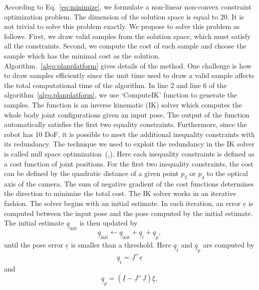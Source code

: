 According to Eq.~\ref{eq:minimize}, we formulate a non-linear non-convex constraint optimization problem. The dimension of the solution space is equal to 20. It is not trivial to solve this problem exactly. We propose to solve this problem as follows. First, we draw valid samples from the solution space, which must satisfy all the constraints. Second, we compute the cost of each sample and choose the sample which has the minimal cost as the solution. Algorithm.~\ref{algo:planplatform} gives details of the method. One challenge is how to draw samples efficiently since the unit time used to draw a valid sample affects the total computational time of the algorithm. In line 2 and line 6 of the algorithm~\ref{algo:planplatform}, we use `ComputeIK' function to generate the samples. The function is an inverse kinematic (IK) solver which computes the whole body joint configurations given an input pose. The output of the function automatically satisfies the first two equality constraints. Furthermore, since the robot has 10 DoF, it is possible to meet the additional inequality constraints with its redundancy. The technique we used to exploit the redundancy in the IK solver is called null space optimization~(\cite{Liegeois1977},\cite{Nakanishi2005}). Here each inequality constraints is defined as a cost function of joint positions. For the first two inequality constraints, the cost can be defined by the quadratic distance of a given point $p_3$ or $p_4$ to the optical axis of the camera. The sum of negative gradient of the cost functions determines the direction to minimize the total cost. The IK solver works in an iterative fashion. The solver begins with an initial estimate. In each iteration, an error $\underline{e}$ is computed between the input pose and the pose computed by the initial estimate. The initial estimate $\underline{q}_{\text{init}}$ is then updated by 
\begin{equation}
\underline{q}_{\text{init}}  \leftarrow \underline{q}_{\text{init}} + \underline{q}_t + \underline{q}_p,
\end{equation}
until the pose error $\underline{e}$ is smaller than a threshold. Here $\underline{q}_t$ and $\underline{q}_p$ are computed by 
\begin{equation}
\underline{q}_t = \underline{J}^+ \underline{e}
\end{equation}
and 
\begin{equation}
\underline{q}_p =  (\underline{I} - \underline{J}^+  \underline{J} )\underline{\xi},
\end{equation}
